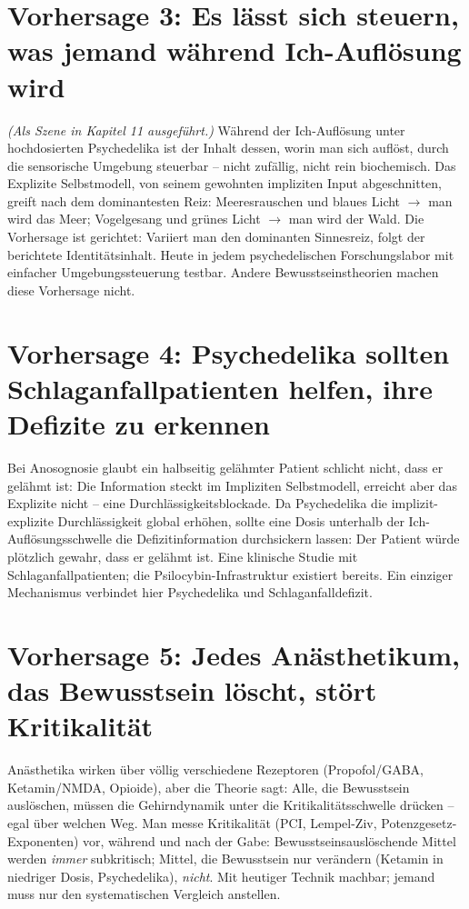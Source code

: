 \documentclass[11pt, twoside, openright]{book}
\begin{document}
\section*{Vorhersage 3: Es lässt sich steuern, was jemand während Ich-Auflösung wird}

\textit{(Als Szene in Kapitel 11 ausgeführt.)} Während der Ich-Auflösung unter hochdosierten Psychedelika ist der Inhalt dessen, worin man sich auflöst, durch die sensorische Umgebung steuerbar -- nicht zufällig, nicht rein biochemisch. Das Explizite Selbstmodell, von seinem gewohnten impliziten Input abgeschnitten, greift nach dem dominantesten Reiz: Meeresrauschen und blaues Licht $\rightarrow$ man wird das Meer; Vogelgesang und grünes Licht $\rightarrow$ man wird der Wald. Die Vorhersage ist gerichtet: Variiert man den dominanten Sinnesreiz, folgt der berichtete Identitätsinhalt. Heute in jedem psychedelischen Forschungslabor mit einfacher Umgebungssteuerung testbar. Andere Bewusstseinstheorien machen diese Vorhersage nicht.

\section*{Vorhersage 4: Psychedelika sollten Schlaganfallpatienten helfen, ihre Defizite zu erkennen}

Bei Anosognosie glaubt ein halbseitig gelähmter Patient schlicht nicht, dass er gelähmt ist: Die Information steckt im Impliziten Selbstmodell, erreicht aber das Explizite nicht -- eine Durchlässigkeitsblockade. Da Psychedelika die implizit-explizite Durchlässigkeit global erhöhen, sollte eine Dosis unterhalb der Ich-Auflösungsschwelle die Defizitinformation durchsickern lassen: Der Patient würde plötzlich gewahr, dass er gelähmt ist. Eine klinische Studie mit Schlaganfallpatienten; die Psilocybin-Infrastruktur existiert bereits. Ein einziger Mechanismus verbindet hier Psychedelika und Schlaganfalldefizit.

\section*{Vorhersage 5: Jedes Anästhetikum, das Bewusstsein löscht, stört Kritikalität}

Anästhetika wirken über völlig verschiedene Rezeptoren (Propofol/GABA, Ketamin/NMDA, Opioide), aber die Theorie sagt: Alle, die Bewusstsein auslöschen, müssen die Gehirndynamik unter die Kritikalitätsschwelle drücken -- egal über welchen Weg. Man messe Kritikalität (PCI, Lempel-Ziv, Potenzgesetz-Exponenten) vor, während und nach der Gabe: Bewusstseinsauslöschende Mittel werden \textit{immer} subkritisch; Mittel, die Bewusstsein nur verändern (Ketamin in niedriger Dosis, Psychedelika), \textit{nicht}. Mit heutiger Technik machbar; jemand muss nur den systematischen Vergleich anstellen.
\end{document}
